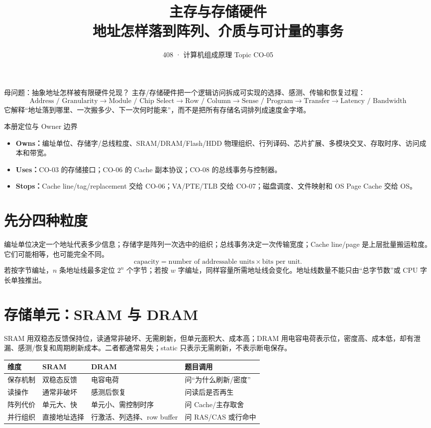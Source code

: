 \documentclass[UTF8,fontset=fandol,11pt,a4paper]{ctexart}
\title{\vspace{-1.1cm}\textbf{主存与存储硬件}\\[0.4em]\large 地址怎样落到阵列、介质与可计量的事务}
\author{408 · 计算机组成原理 Topic CO-05}\date{}
\newcommand{\kw}[1]{\textbf{\color{deep}#1}}\newcommand{\code}[1]{\texttt{#1}}
\begin{document}
\maketitle
\begin{corebox}{母问题：抽象地址怎样被有限硬件兑现？}
主存/存储硬件把一个逻辑访问拆成可实现的选择、感测、传输和恢复过程：
\[
\boxed{\text{Address / Granularity}\to\text{Module / Chip Select}\to\text{Row / Column}\to\text{Sense / Program}\to\text{Transfer}\to\text{Latency / Bandwidth}}
\]
它解释“地址落到哪里、一次搬多少、下一次何时能来”，而不是把所有存储名词排列成速度金字塔。
\end{corebox}
\begin{methodbox}{本册定位与 Owner 边界}
\begin{itemize}
\item \kw{Owns：}编址单位、存储字/总线粒度、SRAM/DRAM/Flash/HDD 物理组织、行列译码、芯片扩展、多模块交叉、存取时序、访问成本和带宽。
\item \kw{Uses：}CO-03 的存储接口；CO-06 的 Cache 副本协议；CO-08 的总线事务与控制器。
\item \kw{Stops：}Cache line/tag/replacement 交给 CO-06；VA/PTE/TLB 交给 CO-07；磁盘调度、文件映射和 OS Page Cache 交给 OS。
\end{itemize}\end{methodbox}
\tableofcontents\newpage

\section{先分四种粒度}
编址单位决定一个地址代表多少信息；存储字是阵列一次选中的组织；总线事务决定一次传输宽度；Cache line/page 是上层批量搬运粒度。它们可能相等，也可能完全不同。
\[
\text{capacity}=\text{number of addressable units}\times\text{bits per unit}.
\]
若按字节编址，$n$ 条地址线最多定位 $2^n$ 个字节；若按 $w$ 字编址，同样容量所需地址线会变化。地址线数量不能只由“总字节数”或 CPU 字长单独推出。

\section{存储单元：SRAM 与 DRAM}
SRAM 用双稳态反馈保持位，读通常非破坏、无需刷新，但单元面积大、成本高；DRAM 用电容电荷表示位，密度高、成本低，却有泄漏、感测/恢复和周期刷新成本。二者都通常易失；static 只表示无需刷新，不表示断电保存。

\begin{center}\small
\begin{tabularx}{\linewidth}{L{2.1cm}YY Y}
\toprule
维度 & SRAM & DRAM & 题目调用\\
\midrule
保存机制 & 双稳态反馈 & 电容电荷 & 问“为什么刷新/密度”\\
读操作 & 通常非破坏 & 感测后恢复 & 问读后是否再生\\
阵列代价 & 单元大、快 & 单元小、需控制时序 & 问 Cache/主存取舍\\
并行组织 & 直接地址选择 & 行激活、列选择、row buffer & 问 RAS/CAS 或行命中\\
\bottomrule
\end{tabularx}\end{center}
\end{document}
